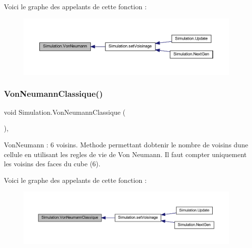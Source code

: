 Voici le graphe des appelants de cette fonction \+:\nopagebreak
\begin{figure}[H]
\begin{center}
\leavevmode
\includegraphics[width=350pt]{class_simulation_af23614524fe3045d198d953f09264f79_icgraph}
\end{center}
\end{figure}
\mbox{\label{class_simulation_a8b95cd2e9f897c0dab40119ac1c54f39}} 
\subsubsection{\texorpdfstring{Von\+Neumann\+Classique()}{VonNeumannClassique()}}
{\footnotesize\ttfamily void Simulation.\+Von\+Neumann\+Classique (\begin{DoxyParamCaption}{ }\end{DoxyParamCaption})\hspace{0.3cm}{\ttfamily [inline]}, {\ttfamily [private]}}



Von\+Neumann \+: 6 voisins. Methode permettant d\textquotesingle{}obtenir le nombre de voisins d\textquotesingle{}une cellule en utilisant les regles de vie de Von Neumann. Il faut compter uniquement les voisins des faces du cube (6). 

Voici le graphe des appelants de cette fonction \+:\nopagebreak
\begin{figure}[H]
\begin{center}
\leavevmode
\includegraphics[width=350pt]{class_simulation_a8b95cd2e9f897c0dab40119ac1c54f39_icgraph}
\end{center}
\end{figure}


